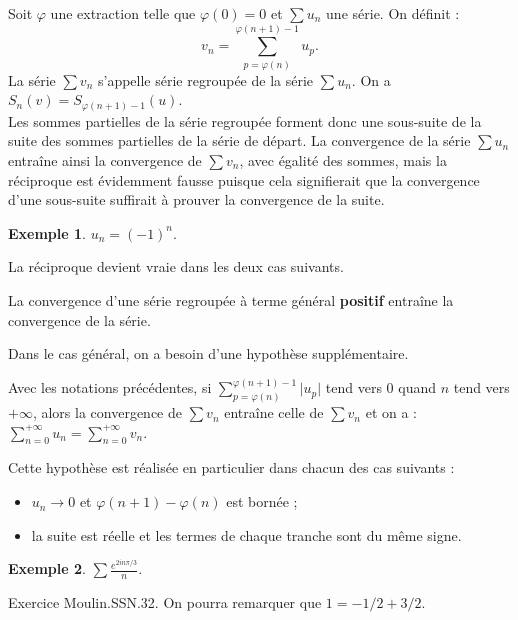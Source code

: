 \documentclass[french]{article}
\theoremstyle{plain}
\theoremstyle{definition}
\newtheorem*{ex}{Exemple}
\theoremstyle{remark}
\begin{document}
Soit $\varphi$ une extraction telle que $\varphi(0)=0$ et $\displaystyle\sum u_n$ une série. On définit : $$v_n=\sum_{p=\varphi(n)}^{\varphi(n+1)-1}u_p.$$
La série $\displaystyle\sum v_n$ s'appelle série regroupée de la série $\displaystyle\sum u_n$. On a $S_n(v)=S_{\varphi(n+1)-1}(u)$. \\
Les sommes partielles de la série regroupée forment donc une sous-suite de la suite des sommes partielles de la série de départ. La convergence de la série $\displaystyle\sum u_n$ entraîne ainsi la convergence de $\displaystyle\sum v_n$, avec égalité des sommes, mais la réciproque est évidemment fausse puisque cela signifierait que la convergence d'une sous-suite suffirait à prouver la convergence de la suite.

\begin{ex}
	$u_n=(-1)^n$.
\end{ex}

La réciproque devient vraie dans les deux cas suivants.

\begin{prop}[]%
	La convergence d'une série regroupée à terme général \textbf{positif} entraîne la convergence de la série.
\end{prop}

Dans le cas général, on a besoin d'une hypothèse supplémentaire.

\begin{prop}%
	Avec les notations précédentes, si $\displaystyle\sum_{p=\varphi(n)}^{\varphi(n+1)-1}\lvert u_p\rvert$ tend vers $0$ quand $n$ tend vers $+\infty$, alors la convergence de $\displaystyle\sum v_n$ entraîne celle de $\displaystyle\sum v_n$ et on a : $\displaystyle\sum_{n=0}^{+\infty}u_n=\sum_{n=0}^{+\infty}v_n$.
\end{prop}

Cette hypothèse est réalisée en particulier dans chacun des cas suivants :
\begin{itemize}
	\item $u_n\to 0$ et $\varphi(n+1)-\varphi(n)$ est bornée ;
	\item la suite est réelle et les termes de chaque tranche sont du même signe. %
\end{itemize}

\begin{ex}
	$\displaystyle\sum\frac{e^{2in\pi/3}}{n}$.
\end{ex}

Exercice Moulin.SSN.32. On pourra remarquer que $1=-1/2+3/2$.
\end{document}
